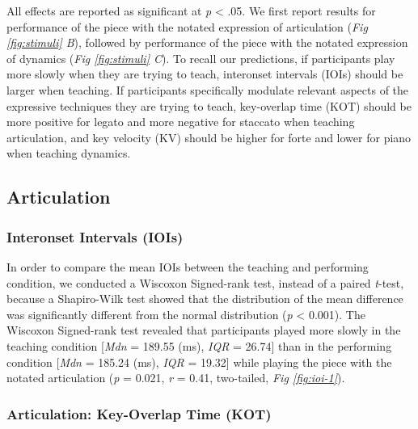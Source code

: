 \documentclass[
  english,
  man,floatsintext]{apa6}
\begin{document}
All effects are reported as significant at \emph{p} \textless{} .05. We first report results for performance of the piece with the notated expression of articulation (\emph{Fig \ref{fig:stimuli} B}), followed by performance of the piece with the notated expression of dynamics (\emph{Fig \ref{fig:stimuli} C}). To recall our predictions, if participants play more slowly when they are trying to teach, interonset intervals (IOIs) should be larger when teaching. If participants specifically modulate relevant aspects of the expressive techniques they are trying to teach, key-overlap time (KOT) should be more positive for legato and more negative for staccato when teaching articulation, and key velocity (KV) should be higher for forte and lower for piano when teaching dynamics.

\hypertarget{articulation}{%
\subsection{Articulation}\label{articulation}}

\hypertarget{interonset-intervals-iois}{%
\subsubsection{Interonset Intervals (IOIs)}\label{interonset-intervals-iois}}

In order to compare the mean IOIs between the teaching and performing condition, we conducted a Wiscoxon Signed-rank test, instead of a paired \emph{t}-test, because a Shapiro-Wilk test showed that the distribution of the mean difference was significantly different from the normal distribution (\emph{p} \textless{} 0.001). The Wiscoxon Signed-rank test revealed that participants played more slowly in the teaching condition {[}\emph{Mdn} = 189.55 (ms), \emph{IQR} = 26.74{]} than in the performing condition {[}\emph{Mdn} = 185.24 (ms), \emph{IQR} = 19.32{]} while playing the piece with the notated articulation (\emph{p} = 0.021, \emph{r} = 0.41, two-tailed, \emph{Fig \ref{fig:ioi-1}}).

\hypertarget{articulation-key-overlap-time-kot}{%
\subsubsection{Articulation: Key-Overlap Time (KOT)}\label{articulation-key-overlap-time-kot}}
\end{document}
